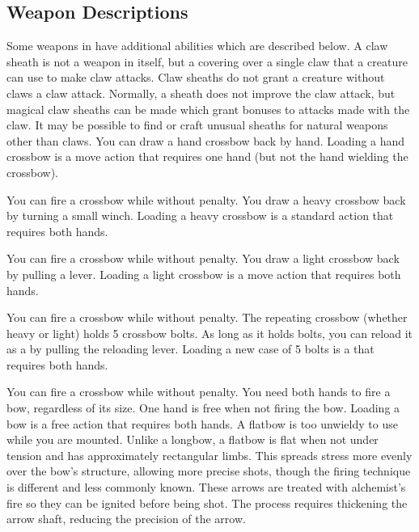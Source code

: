     \subsection{Weapon Descriptions}
        Some weapons in  have additional abilities which are described below.
         A claw sheath is not a weapon in itself, but a covering over a single claw that a creature can use to make claw attacks. Claw sheaths do not grant a creature without claws a claw attack. Normally, a sheath does not improve the claw attack, but magical claw sheaths can be made which grant bonuses to attacks made with the claw. It may be possible to find or craft unusual sheaths for natural weapons other than claws.
         You can draw a hand crossbow back by hand. Loading a hand crossbow is a move action that requires one hand (but not the hand wielding the crossbow).
        \par You can fire a crossbow while \prone without penalty.
         You draw a heavy crossbow back by turning a small winch. Loading a heavy crossbow is a standard action that requires both hands.
        \par You can fire a crossbow while \prone without penalty.
         You draw a light crossbow back by pulling a lever. Loading a light crossbow is a move action that requires both hands.
        \par You can fire a crossbow while \prone without penalty.
         The repeating crossbow (whether heavy or light) holds 5 crossbow bolts. As long as it holds bolts, you can reload it as a  by pulling the reloading lever. Loading a new case of 5 bolts is a  that requires both hands.
        \par You can fire a crossbow while \prone without penalty.
         You need both hands to fire a bow, regardless of its size. One hand is free when not firing the bow. Loading a bow is a free action that requires both hands. A flatbow is too unwieldy to use while you are mounted.
        Unlike a longbow, a flatbow is flat when not under tension and has approximately rectangular limbs.
        This spreads stress more evenly over the bow's structure, allowing more precise shots, though the firing technique is different and less commonly known.
         These arrows are treated with alchemist's fire so they can be ignited before being shot.
        The process requires thickening the arrow shaft, reducing the precision of the arrow.
